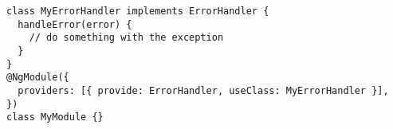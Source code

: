 \begin{verbatim}
class MyErrorHandler implements ErrorHandler {
  handleError(error) {
    // do something with the exception
  }
}
@NgModule({
  providers: [{ provide: ErrorHandler, useClass: MyErrorHandler }],
})
class MyModule {}
\end{verbatim}
